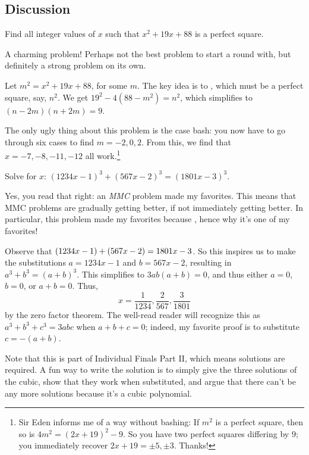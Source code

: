 \documentclass[11pt,paper=letter]{scrartcl}
\begin{document}
\subsection{Discussion}

\begin{probboxed}
   Find all integer values of $x$ such that $x^2 + 19x + 88$ is a perfect square.
\end{probboxed}

A charming problem! Perhaps not the best problem to start a round with, but definitely a strong problem on its own. 

Let $m^2 = x^2 + 19x + 88$, for some $m$. The key idea is to , which must be a perfect square, say, $n^2$. We get $19^2 - 4(88 - m^2) = n^2$, which simplifies to $(n - 2m)(n + 2m) = 9$. 

The only ugly thing about this problem is the case bash: you now have to go through six cases to find $m = -2, 0, 2$. From this, we find that $x = -7, -8, -11, -12$ all work.\footnote{Sir Eden informs me of a way without bashing: If $m^2$ is a perfect square, then so is $4m^2 = (2x+19)^2 - 9$. So you have two perfect squares differing by $9$; you immediately recover $2x + 19 = \pm5, \pm3$. Thanks!}

\begin{probboxed}
   Solve for $x$: $(1234x-1)^3+(567x-2)^3=(1801x-3)^3$.
\end{probboxed}

Yes, you read that right: an \emph{MMC} problem made my favorites. This means that MMC problems are gradually getting better, if not immediately getting better. In particular, this problem made my favorites because , hence why it's one of my favorites!

Observe that $\left( 1234x - 1 \right) + \left( 567x- 2 \right) = 1801x-3$. So this inspires us to make the substitutions $a = 1234x - 1$ and $b = 567x - 2$, resulting in $a^3 + b^3 = (a + b)^3$. This simplifies to $3ab(a + b) = 0$, and thus either $a = 0$, $b = 0$, or $a + b = 0$. Thus, $$x = \dfrac1{1234}, \dfrac2{567}, \dfrac3{1801}$$ by the zero factor theorem. The well-read reader will recognize this as $a^3 + b^3 + c^3 = 3abc$ when $a + b + c = 0$; indeed, my favorite proof is to substitute $c = -(a + b)$.

Note that this is part of Individual Finals Part II, which means solutions are required. A fun way to write the solution is to simply give the three solutions of the cubic, show that they work when substituted, and argue that there can't be any more solutions because it's a cubic polynomial.
\end{document}
